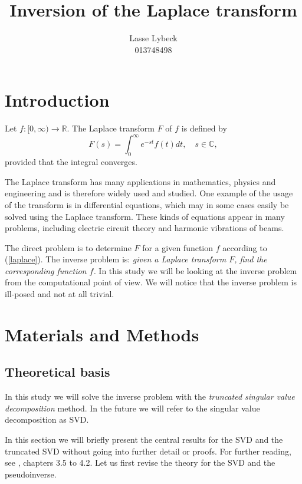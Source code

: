 \documentclass[12pt,a4]{article}
\title{Inversion of the Laplace transform}
\author{Lasse Lybeck\\013748498}
\newcommand{\R}{{\mathbb R}}
\newcommand{\C}{{\mathbb C}}
\begin{document}
\maketitle

\section{Introduction}

Let $f:[0,\infty)\rightarrow \R$. The Laplace transform $F$ of $f$ is defined by
\begin{equation}\label{laplace}
 F(s) = \int_0^\infty e^{-st}f(t)dt,\quad s\in\C ,
\end{equation}
provided that the integral converges.

The Laplace transform has many applications in mathematics, physics and engineering and is therefore widely used and studied. One example of the usage of the transform is in differential equations, which may in some cases easily be solved using the Laplace transform. These kinds of equations appear in many problems, including electric circuit theory and harmonic vibrations of beams. \cite{laplaceweb} \cite{transformsbook}

The direct problem is to determine $F$ for a given function $f$ according to (\ref{laplace}). The inverse problem is: {\em given a Laplace transform $F$, find the corresponding function $f$.} In this study we will be looking at the inverse problem from the computational point of view. We will notice that the inverse problem is ill-posed and not at all trivial.




\section{Materials and Methods}\label{sec:methods}

\subsection{Theoretical basis}

In this study we will solve the inverse problem with the \emph{truncated singular value decomposition} method. In the future we will refer to the singular value decomposition as SVD.

In this section we will briefly present the central results for the SVD and the truncated SVD without going into further detail or proofs. For further reading, see \cite{samu}, chapters 3.5 to 4.2. Let us first revise the theory for the SVD and the pseudoinverse.
\end{document}
